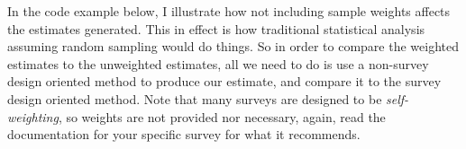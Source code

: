 \documentclass[
]{article}
\newenvironment{Shaded}{\begin{snugshade}}{\end{snugshade}}
\newcommand{\AttributeTok}[1]{\textcolor[rgb]{0.77,0.63,0.00}{#1}}
\newcommand{\CommentTok}[1]{\textcolor[rgb]{0.56,0.35,0.01}{\textit{#1}}}
\newcommand{\DecValTok}[1]{\textcolor[rgb]{0.00,0.00,0.81}{#1}}
\newcommand{\FunctionTok}[1]{\textcolor[rgb]{0.00,0.00,0.00}{#1}}
\newcommand{\NormalTok}[1]{#1}
\newcommand{\OtherTok}[1]{\textcolor[rgb]{0.56,0.35,0.01}{#1}}
\newcommand{\SpecialCharTok}[1]{\textcolor[rgb]{0.00,0.00,0.00}{#1}}
\newcommand{\StringTok}[1]{\textcolor[rgb]{0.31,0.60,0.02}{#1}}
\begin{document}
In the code example below, I illustrate how not including sample weights affects the estimates generated. This in effect is how traditional statistical analysis assuming random sampling would do things. So in order to compare the weighted estimates to the unweighted estimates, all we need to do is use a non-survey design oriented method to produce our estimate, and compare it to the survey design oriented method. Note that many surveys are designed to be \emph{self-weighting}, so weights are not provided nor necessary, again, read the documentation for your specific survey for what it recommends.

\begin{Shaded}
\end{Shaded}
\end{document}
